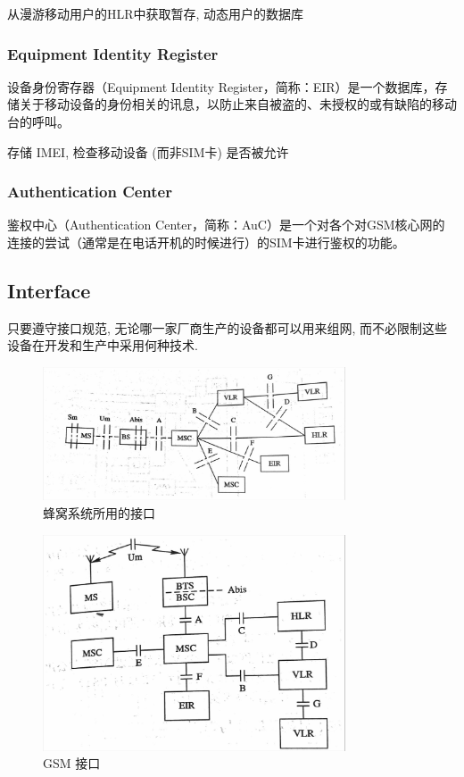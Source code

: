 \documentclass[a4paper]{report}
\begin{document}
 从漫游移动用户的HLR中获取暂存, 动态用户的数据库
 \subsubsection{Equipment Identity Register}
 设备身份寄存器（Equipment Identity Register，简称：EIR）是一个数据库，存储关于移动设备的身份相关的讯息，以防止来自被盗的、未授权的或有缺陷的移动台的呼叫。

 存储 IMEI, 检查移动设备 (而非SIM卡) 是否被允许
 \subsubsection{Authentication Center}
 鉴权中心（Authentication Center，简称：AuC）是一个对各个对GSM核心网的连接的尝试（通常是在电话开机的时候进行）的SIM卡进行鉴权的功能。
\subsection{Interface}
只要遵守接口规范, 无论哪一家厂商生产的设备都可以用来组网, 而不必限制这些设备在开发和生产中采用何种技术. 
\begin{figure}[H]
\centering
\includegraphics[width=0.8\textwidth]{cell_interface.jpg}
\caption{蜂窝系统所用的接口}
\end{figure}
\begin{figure}[H]
\centering
\includegraphics[width=0.8\textwidth]{gsm_interface.jpg}
\caption{GSM 接口}
\end{figure}
\end{document}
